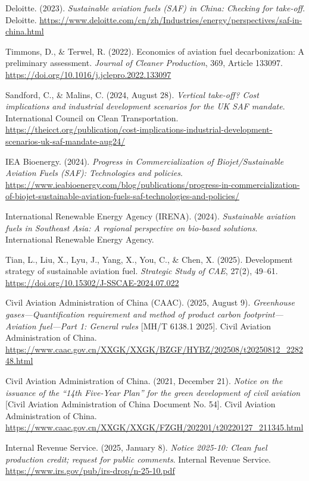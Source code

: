 \documentclass[a4paper,11pt]{article}
\begin{document}
\newpage
\begin{thebibliography}{9}

Deloitte. (2023). \textit{Sustainable aviation fuels (SAF) in China: Checking for take-off}. Deloitte. 
\url{https://www.deloitte.com/cn/zh/Industries/energy/perspectives/saf-in-china.html}

Timmons, D., \& Terwel, R. (2022). Economics of aviation fuel decarbonization: A preliminary assessment. \textit{Journal of Cleaner Production}, 369, Article 133097. 
\url{https://doi.org/10.1016/j.jclepro.2022.133097}

Sandford, C., \& Malins, C. (2024, August 28). \textit{Vertical take-off? Cost implications and industrial development scenarios for the UK SAF mandate}. International Council on Clean Transportation. 
\url{https://theicct.org/publication/cost-implications-industrial-development-scenarios-uk-saf-mandate-aug24/}

IEA Bioenergy. (2024). \textit{Progress in Commercialization of Biojet/Sustainable Aviation Fuels (SAF): Technologies and policies}. 
\url{https://www.ieabioenergy.com/blog/publications/progress-in-commercialization-of-biojet-sustainable-aviation-fuels-saf-technologies-and-policies/}

International Renewable Energy Agency (IRENA). (2024). \textit{Sustainable aviation fuels in Southeast Asia: A regional perspective on bio-based solutions}. International Renewable Energy Agency.

Tian, L., Liu, X., Lyu, J., Yang, X., You, C., \& Chen, X. (2025). Development strategy of sustainable aviation fuel. \textit{Strategic Study of CAE}, 27(2), 49--61. 
\url{https://doi.org/10.15302/J-SSCAE-2024.07.022}

Civil Aviation Administration of China (CAAC). (2025, August 9). \textit{Greenhouse gases---Quantification requirement and method of product carbon footprint---Aviation fuel---Part 1: General rules} [MH/T 6138.1 2025]. Civil Aviation Administration of China. 
\url{https://www.caac.gov.cn/XXGK/XXGK/BZGF/HYBZ/202508/t20250812_228248.html}

Civil Aviation Administration of China. (2021, December 21). \textit{Notice on the issuance of the ``14th Five-Year Plan'' for the green development of civil aviation} [Civil Aviation Administration of China Document No. 54]. Civil Aviation Administration of China. 
\url{https://www.caac.gov.cn/XXGK/XXGK/FZGH/202201/t20220127_211345.html}

Internal Revenue Service. (2025, January 8). \textit{Notice 2025-10: Clean fuel production credit; request for public comments}. Internal Revenue Service. 
\url{https://www.irs.gov/pub/irs-drop/n-25-10.pdf}

\end{thebibliography}
\end{document}
